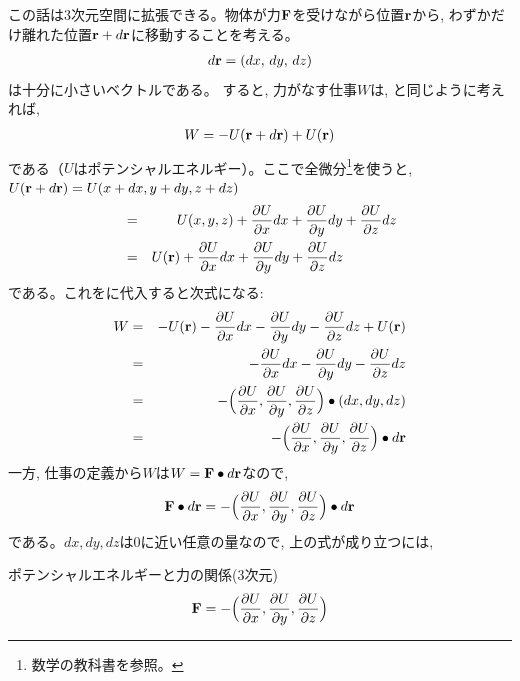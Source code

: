 この話は3次元空間に拡張できる。物体が力${\bf F}$を受けながら位置${\bf r}$から, 
わずかだけ離れた位置${\bf r}+d{\bf r}$に移動することを考える。
\begin{eqnarray}
d{\bf r}=(dx,\, dy,\, dz)
\end{eqnarray}
は十分に小さいベクトルである。
すると, 力がなす仕事$W$は, と同じように考えれば, 
\begin{eqnarray}
W=-U({\bf r}+d{\bf r})+U({\bf r})\label{eq:dW3D}
\end{eqnarray}
である（$U$はポテンシャルエネルギー）。ここで全微分\footnote{数学の教科書を参照。}を使うと, 
$U({\bf r}+d{\bf r})=U(x+dx, y+dy, z+dz)$
\begin{eqnarray}
&=&U(x, y, z)+\frac{\partial U}{\partial x}dx+\frac{\partial U}{\partial y}dy+\frac{\partial U}{\partial z}dz\nonumber\\
&=&U({\bf r})+\frac{\partial U}{\partial x}dx+\frac{\partial U}{\partial y}dy+\frac{\partial U}{\partial z}dz\,\,\,\,\,\,\,\,\,\,\,\,\,\,\,\,\,\,\,\,\,\,\,
\end{eqnarray}
である。これをに代入すると次式になる:
\begin{eqnarray}
W&=&-U({\bf r})-\frac{\partial U}{\partial x}dx-\frac{\partial U}{\partial y}dy-\frac{\partial U}{\partial z}dz+U({\bf r})\nonumber\\
 &=&-\frac{\partial U}{\partial x}dx-\frac{\partial U}{\partial y}dy-\frac{\partial U}{\partial z}dz\nonumber\\
 &=&-\Bigl(\frac{\partial U}{\partial x}, \frac{\partial U}{\partial y}, \frac{\partial U}{\partial z}\Bigr)\bullet(dx, dy, dz)\nonumber\\
 &=&-\Bigl(\frac{\partial U}{\partial x}, \frac{\partial U}{\partial y}, \frac{\partial U}{\partial z}\Bigr)\bullet d{\bf r}
\end{eqnarray}
一方, 仕事の定義から$W$は$W={\bf F}\bullet d{\bf r}$なので, 
\begin{eqnarray} 
{\bf F}\bullet d{\bf r}=-\Bigl(\frac{\partial U}{\partial x}, \frac{\partial U}{\partial y}, \frac{\partial U}{\partial z}\Bigr)\bullet d{\bf r}\label{eq:Fdr_gradUdr}
\end{eqnarray} 
である。$dx, dy, dz$は0に近い任意の量なので, 上の式が成り立つには, 
\begin{itembox}{ポテンシャルエネルギーと力の関係(3次元)}
\begin{eqnarray} 
{\bf F}=-\Bigl(\frac{\partial U}{\partial x}, \frac{\partial U}{\partial y}, \frac{\partial U}{\partial z}\Bigr)\label{eq:F_gradU}
\end{eqnarray} 
\end{itembox}
